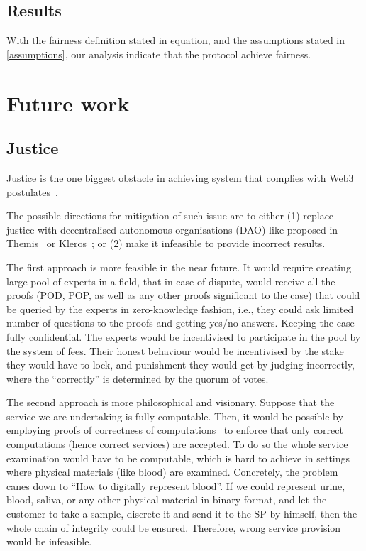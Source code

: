 \documentclass{ieeeaccess}
\begin{document}
\subsection{Results}\label{results}

With the fairness definition stated in equation, and the assumptions
stated in \ref{assumptions}, our analysis indicate that the protocol
achieve fairness.



\section{Future work}\label{future-work}
\subsection{Justice}\label{justice}

Justice is the one biggest obstacle in achieving system that complies with Web3 postulates~\cite{Web3Wiki71}.

The possible directions for mitigation of such issue are to either (1)
replace justice with decentralised autonomous organisations (DAO) like
proposed in Themis~\cite{meng2019themis} or
Kleros~\cite{lesaege2018kleros}; or (2) make it infeasible to provide
incorrect results.

The first approach is more feasible in the near future. It would require
creating large pool of experts in a field, that in case of dispute,
would receive all the proofs (POD, POP, as well as any other proofs
significant to the case) that could be queried by the experts in
zero-knowledge fashion, i.e., they could ask limited number of questions
to the proofs and getting yes/no answers. Keeping the case fully
confidential. The experts would be incentivised to participate in the
pool by the system of fees. Their honest behaviour would be incentivised
by the stake they would have to lock, and punishment they would get by
judging incorrectly, where the ``correctly'' is determined by the quorum
of votes.

The second approach is more philosophical and visionary. Suppose that
the service we are undertaking is fully computable. Then, it would be
possible by employing proofs of correctness of
computations~\cite{ben2013snarks} to enforce that only correct
computations (hence correct services) are accepted. To do so the whole
service examination would have to be computable, which is hard to
achieve in settings where physical materials (like blood) are examined.
Concretely, the problem canes down to ``How to digitally represent
blood''. If we could represent urine, blood, saliva, or any other
physical material in binary format, and let the customer to take a
sample, discrete it and send it to the SP by himself, then the whole
chain of integrity could be ensured. Therefore, wrong service provision
would be infeasible.
\end{document}
